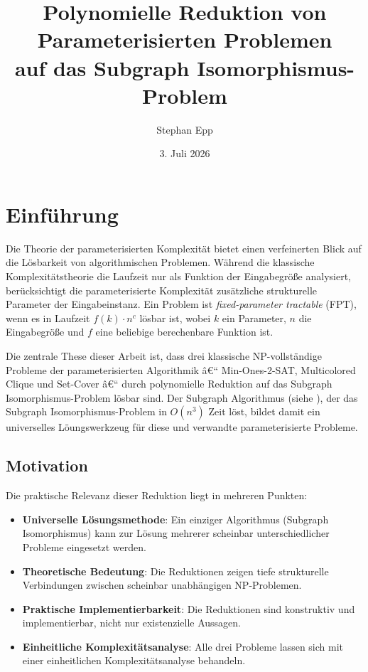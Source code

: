 ﻿\documentclass[a4paper,12pt]{article}
\title{Polynomielle Reduktion von Parameterisierten Problemen\\auf das Subgraph Isomorphismus-Problem}
\author{Stephan Epp}
\date{3. Juli 2026}
\theoremstyle{definition}
\begin{document}
	
\maketitle

\tableofcontents
\newpage

\section{Einführung}

Die Theorie der parameterisierten Komplexität bietet einen verfeinerten Blick auf die Lösbarkeit von algorithmischen Problemen. Während die klassische Komplexitätstheorie die Laufzeit nur als Funktion der Eingabegröße analysiert, berücksichtigt die parameterisierte Komplexität zusätzliche strukturelle Parameter der Eingabeinstanz. Ein Problem ist \emph{fixed-parameter tractable} (FPT), wenn es in Laufzeit $f(k) \cdot n^c$ lösbar ist, wobei $k$ ein Parameter, $n$ die Eingabegröße und $f$ eine beliebige berechenbare Funktion ist.

Die zentrale These dieser Arbeit ist, dass drei klassische NP-vollständige Probleme der parameterisierten Algorithmik â€“ Min-Ones-2-SAT, Multicolored Clique und Set-Cover â€“ durch polynomielle Reduktion auf das Subgraph Isomorphismus-Problem lösbar sind. Der Subgraph Algorithmus (siehe \cite{subgraph2026}), der das Subgraph Isomorphismus-Problem in $O(n^3)$ Zeit löst, bildet damit ein universelles Löungswerkzeug für diese und verwandte parameterisierte Probleme.

\subsection{Motivation}

Die praktische Relevanz dieser Reduktion liegt in mehreren Punkten:

\begin{itemize}
	\item \textbf{Universelle Lösungsmethode}: Ein einziger Algorithmus (Subgraph Isomorphismus) kann zur Lösung mehrerer scheinbar unterschiedlicher Probleme eingesetzt werden.
	
	\item \textbf{Theoretische Bedeutung}: Die Reduktionen zeigen tiefe strukturelle Verbindungen zwischen scheinbar unabhängigen NP-Problemen.
	
	\item \textbf{Praktische Implementierbarkeit}: Die Reduktionen sind konstruktiv und implementierbar, nicht nur existenzielle Aussagen.
	
	\item \textbf{Einheitliche Komplexitätsanalyse}: Alle drei Probleme lassen sich mit einer einheitlichen Komplexitätsanalyse behandeln.
\end{itemize}
\end{document}
